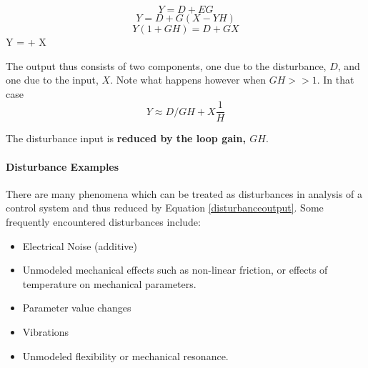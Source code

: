 \[
Y = D + EG
\]
\[
Y = D+ G(X-YH)
\]
\[
Y(1+GH) = D+GX
\]
\bq\label{disturbanceoutput}
Y =  +  X
\eq

 The output thus consists of two components, one due to the disturbance, $D$, and one due to the input, $X$.   Note what happens however when $GH>>1$. In that case
 \[
 Y \approx D/GH + X \frac{1}{H}
 \]

 The disturbance input is {\bf reduced by the loop gain, $GH$}.

\paragraph{Disturbance Examples}

There are many phenomena which can be treated as disturbances in analysis of a control system and thus reduced by Equation \ref{disturbanceoutput}.
Some frequently encountered disturbances include:


\begin{itemize}
  \item Electrical Noise (additive)
  \item Unmodeled mechanical effects such as non-linear friction, or effects of temperature on mechanical parameters.
  \item Parameter value changes
  \item Vibrations
  \item Unmodeled flexibility or mechanical resonance.
\end{itemize}



